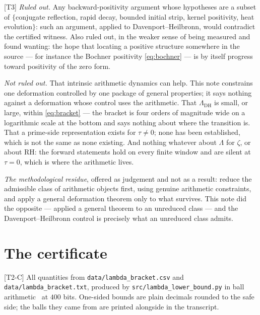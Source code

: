 \documentclass[11pt,a4paper]{article}
\theoremstyle{remark}
\newcommand{\tier}[1]{{\small\textsf{[#1]}}}
\newcommand{\src}[1]{{\footnotesize\texttt{#1}}}
\newcommand{\LamDH}{\Lambda_{\mathrm{DH}}}
\begin{document}
\tier{T3} \emph{Ruled out.} Any backward-positivity argument whose hypotheses are a subset
of $\{$conjugate reflection, rapid decay, bounded initial strip, kernel positivity, heat
evolution$\}$: such an argument, applied to Davenport--Heilbronn, would contradict the
certified witness. Also ruled out, in the weaker sense of being measured and found wanting:
the hope that locating a positive structure somewhere in the source --- for instance the
Bochner positivity \eqref{eq:bochner} --- is by itself progress toward positivity of the
zero form.

\emph{Not ruled out.} That intrinsic arithmetic dynamics can help. This note constrains one
deformation controlled by one package of general properties; it says nothing against a
deformation whose control uses the arithmetic. That $\LamDH$ is small, or large, within
\eqref{eq:bracket} --- the bracket is four orders of magnitude wide on a logarithmic scale
at the bottom and says nothing about where the transition is. That a prime-side
representation exists for $\tau\ne0$; none has been established, which is not the same as
none existing. And nothing whatever about $\Lambda$ for $\zeta$, or about RH: the forward
statements hold on every finite window and are silent at $\tau=0$, which is where the
arithmetic lives.

\emph{The methodological residue}, offered as judgement and not as a result: reduce the
admissible class of arithmetic objects first, using genuine arithmetic constraints, and
apply a general deformation theorem only to what survives. This note did the opposite ---
applied a general theorem to an unreduced class --- and the Davenport--Heilbronn control is
precisely what an unreduced class admits.

\appendix

\section{The certificate}\label{app:cert}

\tier{T2-C} All quantities from \src{data/lambda\_bracket.csv} and
\src{data/lambda\_bracket.txt}, produced by \src{src/lambda\_lower\_bound.py} in ball
arithmetic~\cite{Arb} at $400$ bits. One-sided bounds are plain decimals rounded to the safe
side; the balls they came from are printed alongside in the transcript.
\end{document}

